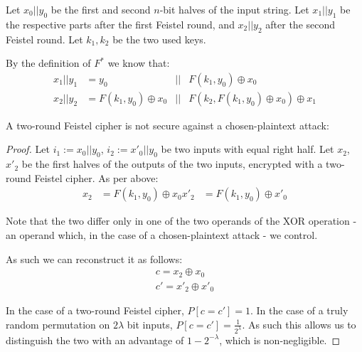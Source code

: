 \documentclass[a4paper]{scrreprt}
\begin{document}
Let $x_0 || y_0$ be the first and second $n$-bit halves of the input string.
Let $x_1 || y_1$ be the respective parts after the first Feistel round, and
$x_2 || y_2$ after the second Feistel round. Let $k_1, k_2$ be the two used
keys.

By the definition of $F^*$ we know that:
\begin{align*}
	x_1 || y_1 & = y_0 & || & F(k_1, y_0) \oplus x_0 \\
	x_2 || y_2 & = F(k_1, y_0) \oplus x_0 & || & F(k_2, F(k_1, y_0) \oplus x_0) \oplus x_1
\end{align*}

A two-round Feistel cipher is not secure against a chosen-plaintext attack:
\begin{proof}
	Let $i_1 := x_0 || y_0$, $i_2 := x'_0 || y_0$ be two inputs with equal
	right half. Let $x_2$, $x'_2$ be the first halves of the outputs of the
	two inputs, encrypted with a two-round Feistel cipher. As per above:
	\begin{align*}
		x_2 & = F(k_1, y_0) \oplus x_0
		x'_2 & = F(k_1, y_0) \oplus x'_0
	\end{align*}

	Note that the two differ only in one of the two operands of the XOR
	operation - an operand which, in the case of a chosen-plaintext attack
	- we control.

	As such we can reconstruct it as follows:
	\begin{align*}
		c = x_2 \oplus x_0 \\
		c' = x'_2 \oplus x'_0
	\end{align*}

	In the case of a two-round Feistel cipher, $P[c = c'] = 1$. In the case
	of a truly random permutation on $2\lambda$ bit inputs, $P[c = c'] =
	\frac{1}{2^\lambda}$. As such this allows us to distinguish the two
	with an advantage of $1 - 2^{-\lambda}$, which is non-negligible.
\end{proof}
\end{document}
